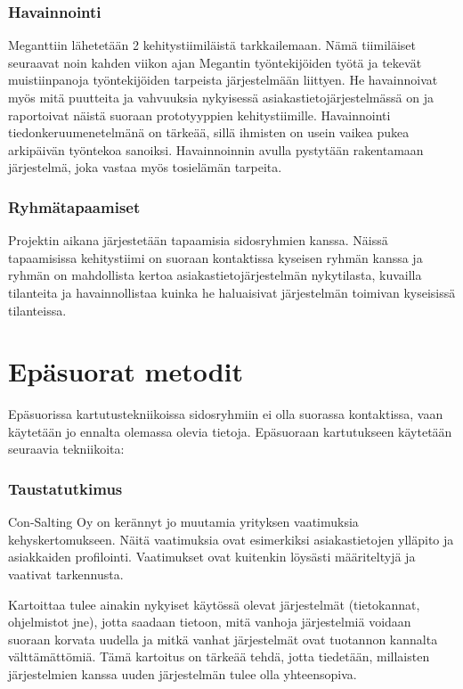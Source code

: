         \subsubsection*{Havainnointi}

            Meganttiin lähetetään 2 kehitystiimiläistä tarkkailemaan. Nämä tiimiläiset seuraavat noin kahden viikon ajan Megantin työntekijöiden työtä ja tekevät 
            muistiinpanoja työntekijöiden tarpeista järjestelmään liittyen. He havainnoivat myös mitä puutteita ja vahvuuksia nykyisessä asiakastietojärjestelmässä on ja raportoivat näistä suoraan prototyyppien kehitystiimille. Havainnointi tiedonkeruumenetelmänä on tärkeää, sillä ihmisten on usein vaikea pukea arkipäivän työntekoa sanoiksi. Havainnoinnin avulla pystytään rakentamaan järjestelmä, joka vastaa myös tosielämän tarpeita.


        \subsubsection*{Ryhmätapaamiset}

            Projektin aikana järjestetään tapaamisia sidosryhmien kanssa. Näissä tapaamisissa kehitystiimi on suoraan kontaktissa kyseisen ryhmän kanssa ja ryhmän on mahdollista kertoa asiakastietojärjestelmän nykytilasta, kuvailla tilanteita ja havainnollistaa kuinka he haluaisivat järjestelmän toimivan kyseisissä tilanteissa.


    \section*{Epäsuorat metodit}

        Epäsuorissa kartutustekniikoissa sidosryhmiin ei olla suorassa kontaktissa, vaan käytetään jo ennalta olemassa olevia tietoja.
        Epäsuoraan kartutukseen käytetään seuraavia tekniikoita:

        \subsubsection*{Taustatutkimus}

        Con-Salting Oy on kerännyt jo muutamia yrityksen vaatimuksia kehyskertomukseen. 
        Näitä vaatimuksia ovat esimerkiksi asiakastietojen ylläpito ja asiakkaiden profilointi.
        Vaatimukset ovat kuitenkin löysästi määriteltyjä ja vaativat tarkennusta.

	Kartoittaa tulee ainakin nykyiset käytössä olevat järjestelmät (tietokannat, ohjelmistot jne), jotta saadaan tietoon, mitä vanhoja järjestelmiä voidaan suoraan korvata uudella ja mitkä vanhat järjestelmät ovat tuotannon kannalta välttämättömiä. Tämä kartoitus on tärkeää tehdä, jotta tiedetään, millaisten järjestelmien kanssa uuden järjestelmän tulee olla yhteensopiva.

